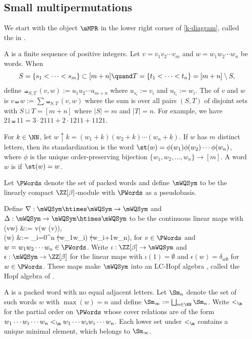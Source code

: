 \subsection{Small multipermutations}
\label{wqsym-sect}

We start with the object $\mMPR$ in the lower right corner of \eqref{k-diagram},
called the  in \cite{LamPyl}.

A  is a finite sequence  of positive integers.
Let $v=v_1v_2\cdots v_m$ and $w=w_1w_2\cdots w_n$ be words.
When 
\[S = \{s_1   < \dots <s_m\} \subset [m+n]
\quand
T= \{t_1 <\dots <t_n\} = [m+n]\setminus S,\]
define  $\shuffle_{S,T}(v,w):=u_1u_2\cdots u_{m+n}$
where $u_{s_i} := v_i$  and $u_{t_i} := w_i$.
The  of $v$ and $w$ is 
$v \shuffle w := \sum \shuffle_{S,T}(v,w)$
where the sum is over all pairs $(S,T)$ of disjoint sets with $S\sqcup T =[m+n]$ where $|S| = m$ and $|T|=n$.
For example,  we have  $21 \shuffle 11  
= 3 \cdot 2111 + 2 \cdot 1211 + 1121.$

For $k \in \NN$, let
$w\uparrow k = (w_1+k)(w_2+k)\cdots (w_n+k)$.
If $w$ has $m$ distinct letters, then its standardization is the word
$\st(w) = \phi(w_1)\phi(w_2)\cdots \phi(w_n)$,
where $\phi$ is the unique order-preserving bijection $\{w_1,w_2,\dots,w_n\}\to[m]$.
A word $w$ is 
if $\st(w) = w$.

\begin{definition}
Let $\PWords$ denote the set of packed words and define 
$\mWQSym$ to be the linearly compact $\ZZ[\beta]$-module with $\PWords$ as a pseudobasis. 
\end{definition}

Define   $\nabla : \mWQSym \htimes \mWQSym \to \mWQSym
$
and 
$
\Delta : \mWQSym \to \mWQSym \htimes \mWQSym
$
to be the continuous linear maps with
\be\label{packed-prod-eq}
\ba
\nabla(v\otimes w) &:= v\shuffle (w \uparrow \max(v)),
\\
\Delta(w) &:= \sum_{i=0}^n \st(w_1\cdots w_i) \otimes \st(w_{i+1}\cdots w_n),
\ea
\ee
for $v \in \PWords$ and
$w=w_1w_2\cdots w_n \in \PWords$.
Write 
$\iota : \ZZ[\beta] \to \mWQSym$
and
$\epsilon : \mWQSym\to \ZZ[\beta]$
for the linear maps with
$\iota(1) = \emptyset$
and
$\epsilon(w) = \delta_{w\emptyset}$
for $w \in \PWords$.
These maps make
$\mWQSym$ into an LC-Hopf algebra 
 \cite[Prop.~3.11]{Marberg2018},
 called the Hopf algebra of .


A  is a packed word with no equal adjacent letters.
Let $\Sm_n$ denote the set of such words $w$ with $\max(w) = n$
and define $\Sm_\infty := \bigsqcup_{n \in \NN} \Sm_n$.
%
Write $<_\m$ for the partial order on $\PWords$ whose cover relations are of the form $w_1\cdots w_i\cdots w_n <_\m w_1 \cdots w_{i}w_{i}\cdots w_n $.
Each lower set under $<_\m$ contains a unique minimal element, which belongs to $\Sm_\infty$.

